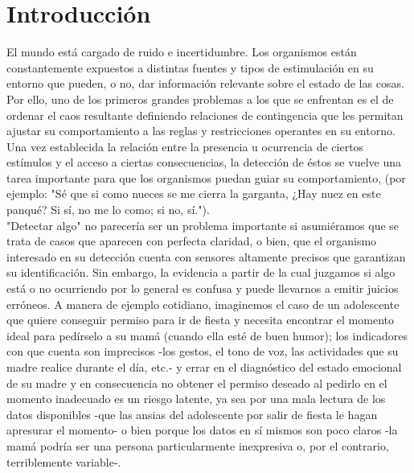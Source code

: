 
\chapter{Introducción} %

\label{Chapter1} %


\newcommand{\keyword}[1]{\textbf{#1}}
\newcommand{\tabhead}[1]{\textbf{#1}}
\newcommand{\code}[1]{\texttt{#1}}
\newcommand{\file}[1]{\texttt{\bfseries#1}}
\newcommand{\option}[1]{\texttt{\itshape#1}}


El mundo está cargado de ruido e incertidumbre. Los organismos están constantemente expuestos a distintas fuentes y tipos de estimulación en su entorno que pueden, o no, dar información relevante sobre el estado de las cosas. Por ello, uno de los primeros grandes problemas a los que se enfrentan es el de ordenar el caos resultante definiendo relaciones de contingencia que les permitan ajustar su comportamiento a las reglas y restricciones operantes en su entorno. Una vez establecida la relación entre la presencia u ocurrencia de ciertos estímulos y el acceso a ciertas consecuencias, la detección de éstos se vuelve una tarea importante para que los organismos puedan guiar su comportamiento, (por ejemplo: "Sé que si como nueces se me cierra la garganta, ¿Hay nuez en este panqué? Si sí, no me lo como; si no, sí.").\\

"Detectar algo" no parecería ser un problema importante si asumiéramos que se trata de casos que aparecen con perfecta claridad, o bien, que el organismo interesado en su detección cuenta con sensores altamente precisos que garantizan su identificación. Sin embargo, la evidencia a partir de la cual juzgamos si algo está o no ocurriendo por lo general es confusa y puede llevarnos a emitir juicios erróneos. A manera de ejemplo cotidiano, imaginemos el caso de un adolescente que quiere conseguir permiso para ir de fiesta y necesita encontrar el momento ideal para pedírselo a su mamá (cuando ella esté de buen humor); los indicadores con que cuenta son imprecisos -los gestos, el tono de voz, las actividades que su madre realice durante el día, etc.- y errar en el diagnóstico del estado emocional de su madre y en consecuencia no obtener el permiso deseado al pedirlo en el momento inadecuado es un riesgo latente, ya sea por una mala lectura de los datos disponibles -que las ansias del adolescente por salir de fiesta le hagan apresurar el momento- o bien porque los datos en sí mismos son poco claros -la mamá podría ser una persona particularmente inexpresiva o, por el contrario, terriblemente variable-.\\ 

